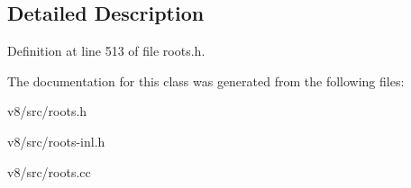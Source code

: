 \subsection{Detailed Description}


Definition at line 513 of file roots.\+h.



The documentation for this class was generated from the following files\+:\begin{DoxyCompactItemize}
\item 
v8/src/roots.\+h\item 
v8/src/roots-\/inl.\+h\item 
v8/src/roots.\+cc\end{DoxyCompactItemize}
